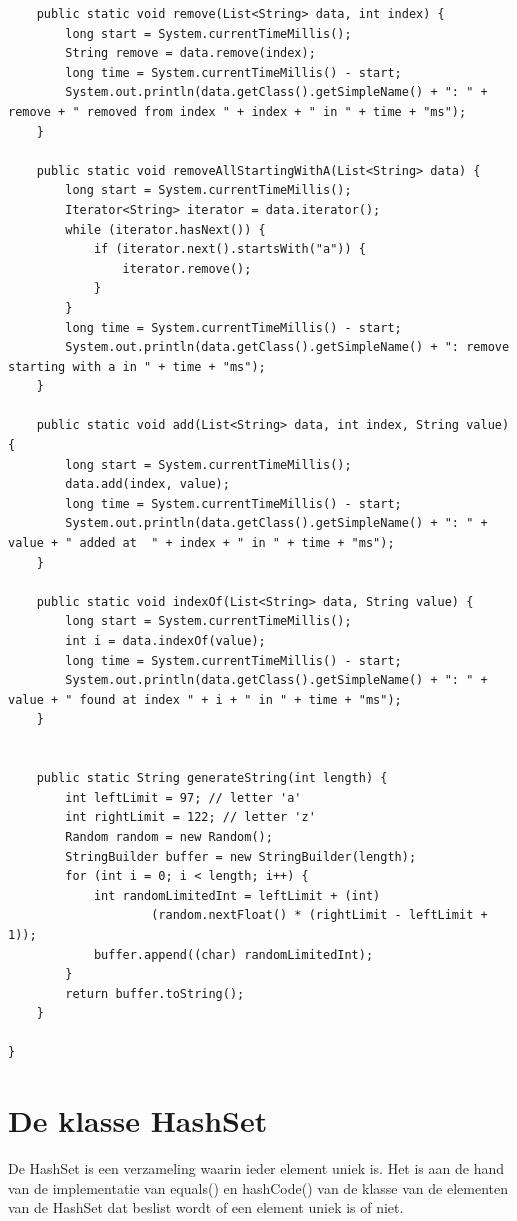 \documentclass{tstextbook}
\begin{document}
\begin{lstlisting}
	public static void remove(List<String> data, int index) {
		long start = System.currentTimeMillis();
		String remove = data.remove(index);
		long time = System.currentTimeMillis() - start;
		System.out.println(data.getClass().getSimpleName() + ": " + remove + " removed from index " + index + " in " + time + "ms");
	}

	public static void removeAllStartingWithA(List<String> data) {
		long start = System.currentTimeMillis();
		Iterator<String> iterator = data.iterator();
		while (iterator.hasNext()) {
			if (iterator.next().startsWith("a")) {
				iterator.remove();
			}
		}
		long time = System.currentTimeMillis() - start;
		System.out.println(data.getClass().getSimpleName() + ": remove starting with a in " + time + "ms");
	}

	public static void add(List<String> data, int index, String value) {
		long start = System.currentTimeMillis();
		data.add(index, value);
		long time = System.currentTimeMillis() - start;
		System.out.println(data.getClass().getSimpleName() + ": " + value + " added at  " + index + " in " + time + "ms");
	}

	public static void indexOf(List<String> data, String value) {
		long start = System.currentTimeMillis();
		int i = data.indexOf(value);
		long time = System.currentTimeMillis() - start;
		System.out.println(data.getClass().getSimpleName() + ": " + value + " found at index " + i + " in " + time + "ms");
	}


	public static String generateString(int length) {
		int leftLimit = 97; // letter 'a'
		int rightLimit = 122; // letter 'z'
		Random random = new Random();
		StringBuilder buffer = new StringBuilder(length);
		for (int i = 0; i < length; i++) {
			int randomLimitedInt = leftLimit + (int)
					(random.nextFloat() * (rightLimit - leftLimit + 1));
			buffer.append((char) randomLimitedInt);
		}
		return buffer.toString();
	}

}
\end{lstlisting}

\section{De klasse HashSet}

De HashSet is een verzameling waarin ieder element uniek is. 
Het is aan de hand van de implementatie van equals() en hashCode() van de klasse van de elementen van de HashSet dat beslist wordt of een element uniek is of niet.
\end{document}
